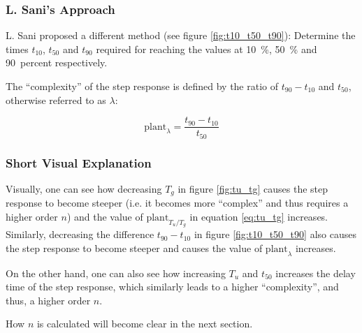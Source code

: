 \subsubsection*{L. Sani's Approach}

L.  Sani  proposed   a  different  method  (see  figure  \ref{fig:t10_t50_t90}):
Determine the  times  $t_{10}$,  $t_{50}$ and $t_{90}$ required for reaching the
values   at    \SI{10}{\percent},    \SI{50}{\percent}    and   \SI{90}{percent}
respectively.

The   ``complexity''   of  the  step  response  is  defined  by  the  ratio   of
$t_{90}-t_{10}$   and   $t_{50}$,   otherwise   referred   to   as    $\lambda$:

\begin{equation}
    \textrm{plant}_{\lambda} = \frac{t_{90}-t_{10}}{t_{50}}
    \label{eq:t10_t50_t90}
\end{equation}


\subsubsection*{Short Visual Explanation}

Visually, one can see how decreasing $T_g$ in figure \ref{fig:tu_tg}  causes the
step  response  to become steeper (i.e. it becomes  more  ``complex''  and  thus
requires  a  higher  order  $n$)  and the value of $\textrm{plant}_{T_u/T_g}$ in
equation  \ref{eq:tu_tg}  increases.   Similarly,   decreasing   the  difference
$t_{90}-t_{10}$ in figure \ref{fig:t10_t50_t90} also causes the step response to
become  steeper  and causes the value of  $\textrm{plant}_{\lambda}$  increases.

On the other hand, one can  also see how increasing $T_u$ and $t_{50}$ increases
the delay  time  of  the  step  response,  which  similarly  leads  to  a higher
``complexity'', and thus, a higher order $n$.

How $n$ is calculated will become clear in the next section.

